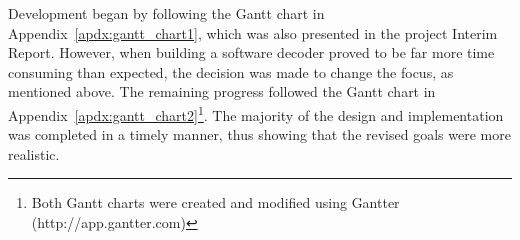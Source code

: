 	Development began by following the Gantt chart in Appendix~\ref{apdx:gantt_chart1}, which was also presented in the project Interim Report.  However, when building a software decoder proved to be far more time consuming than expected, the decision was made to change the focus, as mentioned above.  
	The remaining progress followed the Gantt chart in Appendix~\ref{apdx:gantt_chart2}\footnote{Both Gantt charts were created and modified using Gantter (http://app.gantter.com)}.  The majority of the design and implementation was completed in a timely manner, thus showing that the revised goals were more realistic.



